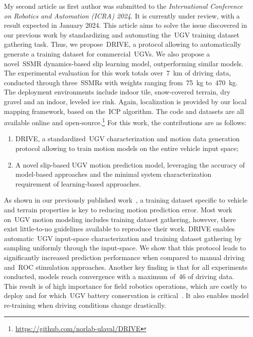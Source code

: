 \documentclass[12pt,letterpaper,oneside]{article}
\begin{document}
My second article as first author was submitted to the \emph{International Conference on Robotics and Automation (ICRA) 2024}.
It is currently under review, with a result expected in January 2024.
This article aims to solve the issue discovered in our previous work by standardizing and automating the~\ac{UGV} training dataset gathering task.
Thus, we propose~\ac{DRIVE}, a protocol allowing to automatically generate a training dataset for commercial~\acp{UGV}.
We also propose a novel~\ac{SSMR} dynamics-based slip learning model, outperforming similar models.
The experimental evaluation for this work totals over~\SI{7}{\kilo\meter} of driving data, conducted through three~\acp{SSMR} with weights ranging from~\SI{75}{\kilo\gram} to~\SI{470}{\kilo\gram}.
The deployment environments include indoor tile, snow-covered terrain, dry gravel and an indoor, leveled ice rink.
Again, localization is provided by our local mapping framework, based on the~\ac{ICP} algorithm.
The code and datasets are all available online and open-source.\footnote{\url{https://github.com/norlab-ulaval/DRIVE}}
For this work, the contributions are as follows:
\begin{enumerate}
	\item \ac{DRIVE}, a standardized~\ac{UGV} characterization and motion data generation protocol allowing to train motion models on the entire vehicle input space;
	\item A novel slip-based \ac{UGV} motion prediction model, leveraging the accuracy of model-based approaches and the minimal system characterization requirement of learning-based approaches.
\end{enumerate}
As shown in our previously published work~\citep{Baril2020}, a training dataset specific to vehicle and terrain properties is key to reducing motion prediction error.
Most work on~\ac{UGV} motion modeling includes training dataset gathering, however, there exist little-to-no guidelines available to reproduce their work.
\ac{DRIVE} enables automatic~\ac{UGV} input-space characterization and training dataset gathering by sampling uniformly through the input-space.
We show that this protocol leads to significantly increased prediction performance when compared to manual driving and~\acf{ROC} stimulation approaches.
Another key finding is that for all experiments conducted, models reach convergence with a maximum of~\SI{46}{\sec} of driving data.
This result is of high importance for field robotics operations, which are costly to deploy and for which~\ac{UGV} battery conservation is critical~\citep{Baril2022}.
It also enables model re-training when driving conditions change drastically.
\end{document}
